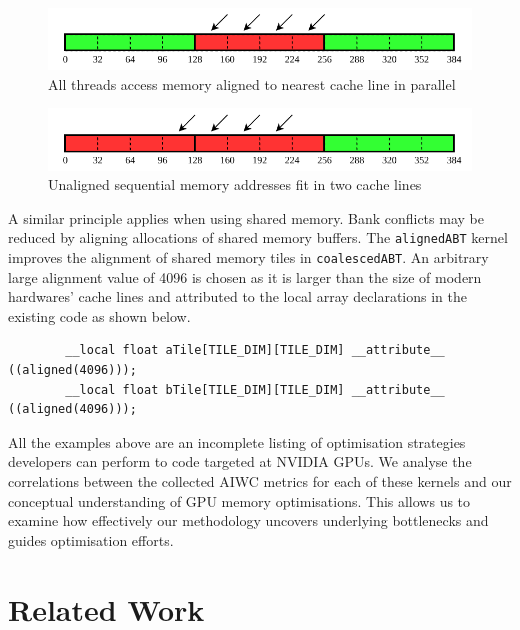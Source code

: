 \documentclass[review=false, sigchi]{acmart}
\begin{document}
	\begin{figure}[h]
		\includegraphics[width=\linewidth]{aligned_access_coalescing.pdf}
		\caption{All threads access memory aligned to nearest cache line in parallel \cite{cudaoptimisation}}
		\label{fig: Simple memory alignment}
	\end{figure}
	
	\begin{figure}[h]
		\includegraphics[width=\linewidth]{misaligned_access_coalescing.pdf}
		\caption{Unaligned sequential memory addresses fit in two cache lines \cite{cudaoptimisation}}
		\label{fig: Simple memory misalignment}
	\end{figure}
	
	A similar principle applies when using shared memory. Bank conflicts may be reduced by aligning allocations of shared memory buffers. The \texttt{alignedABT} kernel improves the alignment of shared memory tiles in \texttt{coalescedABT}. An arbitrary large alignment value of 4096 is chosen as it is larger than the size of modern hardwares' cache lines and attributed to the local array declarations in the existing code as shown below.
	
	\begin{lstlisting}
		__local float aTile[TILE_DIM][TILE_DIM] __attribute__ ((aligned(4096)));
		__local float bTile[TILE_DIM][TILE_DIM] __attribute__ ((aligned(4096)));
	\end{lstlisting}
	
	All the examples above are an incomplete listing of optimisation strategies developers can perform to code targeted at NVIDIA GPUs. We analyse the correlations between the collected AIWC metrics for each of these kernels and our conceptual understanding of GPU memory optimisations. This allows us to examine how effectively our methodology uncovers underlying bottlenecks and guides optimisation efforts.
	
	\flushbottom
	\section{Related Work} \label{related work}
	
\end{document}
